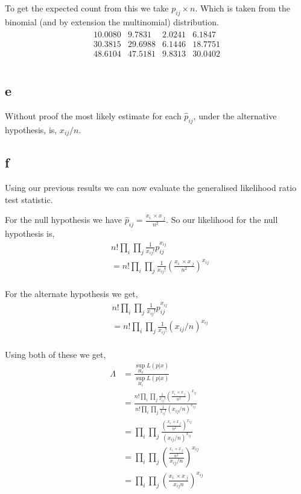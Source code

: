 \documentclass{article}
\begin{document}
To get the expected count from this we take $p_{ij} \times n$. Which is taken
from the binomial (and by extension the multinomial) distribution.
\begin{align*}
    \begin{matrix}
        10.0080 &  9.7831 &  2.0241 &  6.1847 \\
        30.3815 & 29.6988 &  6.1446 & 18.7751 \\
        48.6104 & 47.5181 &  9.8313 & 30.0402 \\
    \end{matrix}
\end{align*}

\subsection{e}
Without proof the most likely estimate for each $\hat{p}_{ij}$, under the
alternative hypothesis, is, $x_{ij}/n$.

\subsection{f}
Using our previous results we can now evaluate the generalised likelihood ratio
test statistic.

For the null hypothesis we have
$\hat{p}_{ij} = \frac{x_{i.}\times x_{.j}}{n^2}$.
So our likelihood for the null hypothesis is,
\begin{align*}
    &n! \prod_{i} \prod_{j} \frac{1}{x_{ij}!} p_{ij}^{x_{ij}} \\
    &= n! \prod_{i} \prod_{j}
    \frac{1}{x_{ij}!}
    \left(\frac{x_{i.}\times x_{.j}}{n^2}\right)^{x_{ij}} \\
\end{align*}

For the alternate hypothesis we get,
\begin{align*}
    &n! \prod_{i} \prod_{j} \frac{1}{x_{ij}!} p_{ij}^{x_{ij}} \\
    &= n! \prod_{i} \prod_{j}
    \frac{1}{x_{ij}!}
    \left(x_{ij}/n\right)^{x_{ij}} \\
\end{align*}

Using both of these we get,
\begin{align*}
    \Lambda &= \frac{\sup_{H_0} L(p|x)}{\sup_{H_1} L(p|x)} \\
    &= \frac{n! \prod_{i} \prod_{j}
    \frac{1}{x_{ij}!}
    \left(\frac{x_{i.}\times x_{.j}}{n^2}\right)^{x_{ij}}}
    {n! \prod_{i} \prod_{j}
    \frac{1}{x_{ij}!}
    \left(x_{ij}/n\right)^{x_{ij}}} \\
    &= \prod_{i} \prod_{j}
    \frac{\left(\frac{x_{i.}\times x_{.j}}{n^2}\right)^{x_{ij}}}
    {\left(x_{ij}/n\right)^{x_{ij}}} \\
    &= \prod_{i} \prod_{j}
    \left(\frac{\frac{x_{i.}\times x_{.j}}{n^2}}
    {x_{ij}/n}\right)^{x_{ij}} \\
    &= \prod_{i} \prod_{j}
    \left(\frac{x_{i.}\times x_{.j}}
    {x_{ij}n}\right)^{x_{ij}}
\end{align*}
\end{document}
